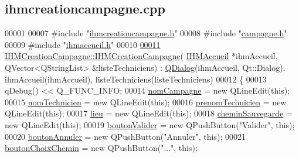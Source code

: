 \hypertarget{ihmcreationcampagne_8cpp_source}{}\subsection{ihmcreationcampagne.\+cpp}
\label{ihmcreationcampagne_8cpp_source}

\begin{DoxyCode}
00001 
00007 \textcolor{preprocessor}{#include "\hyperlink{ihmcreationcampagne_8h}{ihmcreationcampagne.h}"}
00008 \textcolor{preprocessor}{#include "\hyperlink{campagne_8h}{campagne.h}"}
00009 \textcolor{preprocessor}{#include "\hyperlink{ihmaccueil_8h}{ihmaccueil.h}"}
00010 
\hyperlink{class_i_h_m_creation_campagne_a0e9cce2b950a638f1bf012b79d05eb9c}{00011} \hyperlink{class_i_h_m_creation_campagne_a0e9cce2b950a638f1bf012b79d05eb9c}{IHMCreationCampagne::IHMCreationCampagne}(
      \hyperlink{class_i_h_m_accueil}{IHMAccueil} *ihmAccueil, QVector<QStringList> &listeTechniciens) : 
      \hyperlink{class_q_dialog}{QDialog}(ihmAccueil, Qt::Dialog), ihmAccueil(ihmAccueil), listeTechniciens(listeTechniciens)
00012 \{
00013     qDebug() << Q\_FUNC\_INFO;
00014     \hyperlink{class_i_h_m_creation_campagne_a6f07f2571a10f035c7b6a3ef1daefdab}{nomCampagne} = \textcolor{keyword}{new} QLineEdit(\textcolor{keyword}{this});
00015     \hyperlink{class_i_h_m_creation_campagne_a5546fee9a51daceb1b719b105427dfe9}{nomTechnicien} = \textcolor{keyword}{new} QLineEdit(\textcolor{keyword}{this});
00016     \hyperlink{class_i_h_m_creation_campagne_a95e0a4f224110a79731e947baa505b7e}{prenomTechnicien} = \textcolor{keyword}{new} QLineEdit(\textcolor{keyword}{this});
00017     \hyperlink{class_i_h_m_creation_campagne_af68a722acc97a1011ff82752169a2ac8}{lieu} = \textcolor{keyword}{new} QLineEdit(\textcolor{keyword}{this});
00018     \hyperlink{class_i_h_m_creation_campagne_a95c12e2d42063f9c510704b87e3357da}{cheminSauvegarde} = \textcolor{keyword}{new} QLineEdit(\textcolor{keyword}{this});
00019     \hyperlink{class_i_h_m_creation_campagne_a7c1dbc0141ba19b9ac16ea1444cd5d6f}{boutonValider} = \textcolor{keyword}{new} QPushButton(\textcolor{stringliteral}{"Valider"}, \textcolor{keyword}{this});
00020     \hyperlink{class_i_h_m_creation_campagne_ab20ebd5f09b98103c682ed2e1b192a1d}{boutonAnnuler} = \textcolor{keyword}{new} QPushButton(\textcolor{stringliteral}{"Annuler"}, \textcolor{keyword}{this});
00021     \hyperlink{class_i_h_m_creation_campagne_ab709b06a83d8e1ebf9c920e7c60e2d79}{boutonChoixChemin} = \textcolor{keyword}{new} QPushButton(\textcolor{stringliteral}{"..."}, \textcolor{keyword}{this});

\end{DoxyCode}
